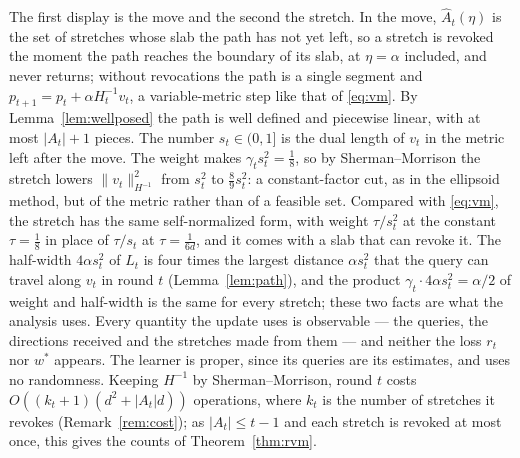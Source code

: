 \documentclass[11pt]{article}
\theoremstyle{plain}
\theoremstyle{definition}
\theoremstyle{remark}
\newcommand{\wstar}{w^{\ast}}
\begin{document}
The first display is the move and the second the stretch. In the move, $\hat A_t(\eta)$ is the set of
stretches whose slab the path has not yet left, so a stretch is revoked the moment the path reaches
the boundary of its slab, at $\eta=\alpha$ included, and never returns; without revocations the path
is a single segment and $p_{t+1}=p_t+\alpha H_t^{-1}v_t$, a variable-metric step like that of
\eqref{eq:vm}. By
Lemma~\ref{lem:wellposed} the path is well defined and piecewise linear, with at most $|A_t|+1$
pieces. The number $s_t\in(0,1]$ is the dual length of $v_t$ in the metric left after the move. The
weight makes $\gamma_ts_t^{2}=\tfrac18$, so by Sherman--Morrison the stretch lowers
$\|v_t\|^{2}_{H^{-1}}$ from $s_t^{2}$ to $\tfrac89s_t^{2}$: a constant-factor cut, as in the
ellipsoid method, but of the metric rather than of a feasible set. Compared with \eqref{eq:vm}, the
stretch has the same self-normalized form, with weight $\tau/s_t^{2}$ at the constant
$\tau=\tfrac18$ in place of $\tau/s_t$ at $\tau=\tfrac{1}{6d}$, and it comes with a slab that can
revoke it. The half-width $4\alpha s_t^{2}$ of $L_t$ is four times the largest distance
$\alpha s_t^{2}$ that the query can travel along $v_t$ in round $t$ (Lemma~\ref{lem:path}), and the
product $\gamma_t\cdot4\alpha s_t^{2}=\alpha/2$ of weight and half-width is the same for every
stretch; these two facts are what the analysis uses. Every quantity the update uses is observable
--- the queries, the directions received and the stretches made from them --- and neither the loss
$r_t$ nor $\wstar$ appears. The learner is proper, since its queries are its estimates, and uses no
randomness. Keeping $H^{-1}$ by Sherman--Morrison, round $t$ costs $O((k_t+1)(d^{2}+|A_t|d))$
operations, where $k_t$ is the number of stretches it revokes (Remark~\ref{rem:cost}); as
$|A_t|\le t-1$ and each stretch is revoked at most once, this gives the counts of
Theorem~\ref{thm:rvm}.
\end{document}
